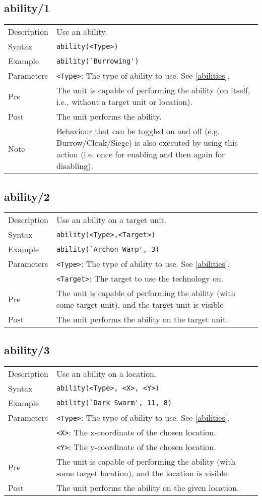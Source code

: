\subsection{ability/1}
\begin{tabularx}{\textwidth}{lX}
 Description & Use an ability. \\
 Syntax & \verb|ability(<Type>)| \\
 Example & \verb|ability(`Burrowing')| \\
 Parameters & \verb|<Type>|: The type of ability to use. See \ref{abilities}. \\
 Pre & The unit is capable of performing the ability (on itself, i.e., without a target unit or location). \\
 Post & The unit performs the ability. \\
 Note & Behaviour that can be toggled on and off (e.g. Burrow/Cloak/Siege) is also executed by using this action (i.e. once for enabling and then again for disabling).
\end{tabularx}

\subsection{ability/2}
\begin{tabularx}{\textwidth}{lX}
 Description & Use an ability on a target unit. \\
 Syntax & \verb|ability(<Type>,<Target>)| \\
 Example & \verb|ability(`Archon Warp', 3)| \\
 Parameters & \verb|<Type>|: The type of ability to use. See \ref{abilities}. \\
            & \verb|<Target>|: The target to use the technology on.\\
 Pre & The unit is capable of performing the ability (with some target unit), and the target unit is visible \\
 Post & The unit performs the ability on the target unit.
\end{tabularx}

\subsection{ability/3}
\begin{tabularx}{\textwidth}{lX}
 Description & Use an ability on a location. \\
 Syntax & \verb|ability(<Type>, <X>, <Y>)| \\
 Example & \verb|ability(`Dark Swarm', 11, 8)| \\
 Parameters & \verb|<Type>|: The type of ability to use. See \ref{abilities}. \\
            & \verb|<X>|: The x-coordinate of the chosen location. \\
            & \verb|<Y>|: The y-coordinate of the chosen location. \\
 Pre & The unit is capable of performing the ability (with some target location), and the location is visible. \\
 Post & The unit performs the ability on the given location.
\end{tabularx}

